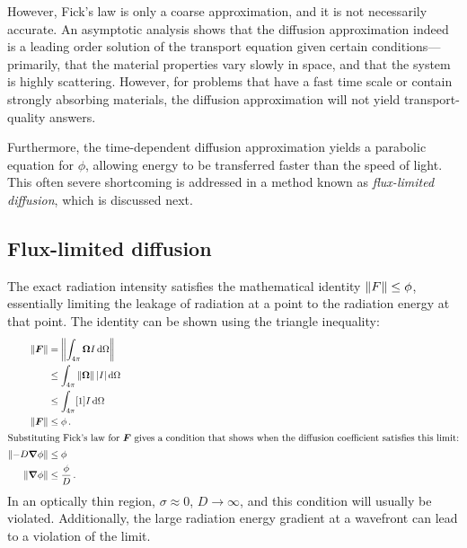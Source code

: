 However, Fick's law is only a coarse approximation, and it is not
necessarily accurate. An asymptotic analysis \cite{Lar1975,Lar1983a} shows that
the diffusion approximation indeed is a leading
order solution of the transport equation given certain conditions---%
primarily, that the material properties vary slowly in space, and that the
system is highly scattering. However, for problems that have a fast time scale
or contain strongly absorbing materials, the diffusion approximation will not
yield transport-quality answers.

Furthermore, the time-dependent diffusion approximation yields a parabolic equation
for $\phi$, allowing energy to be transferred faster than the speed of light. This
often severe shortcoming is addressed in a method known as \emph{flux-limited
diffusion}, which is discussed next.

\subsection{Flux-limited diffusion}\label{sec:bgFld}

The exact radiation intensity satisfies the mathematical identity $\left\| F \right\| \le
\phi$,
essentially limiting the leakage of radiation at a point to the radiation
energy at that point. The identity can be shown using the triangle inequality:
\begin{align}
  \left\| \bm{F} \right\| &= \left\|  \int_{4\pi} \bm{\Omega} I \mathop{}\!\mathrm{d} \Omega \right\|
  \\ \nonumber
  &\le \int_{4\pi} \left\| \bm{\Omega} \right\| \left| I \right| \mathop{}\!\mathrm{d} \Omega 
  \\ \nonumber
  &\le \int_{4\pi} [1] I \mathop{}\!\mathrm{d}\Omega
  \\ \label{eq:fluxLimit}
  \left\| \bm{F} \right\| &\le \phi\,.
  \\ 
  \intertext{Substituting Fick's law for $\bm{F}$ gives a condition that
  shows when the
  diffusion coefficient satisfies this limit:} \nonumber
  \left\| - D \bm{\nabla} \phi \right\| &\le \phi
  \\ \label{eq:fluxLimitDiffusion}
  \left\| \bm{\nabla} \phi \right\| & \le \frac{\phi}{D} \,.
\end{align}
In an optically thin region, $\sigma\approx 0$, $D\to\infty$, and this condition
will usually be violated. Additionally, the large radiation energy gradient at a
wavefront can lead to a violation of the limit.

